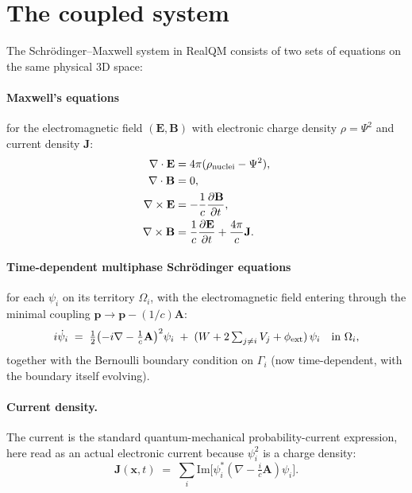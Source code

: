\section{The coupled system}\label{sec:sm-coupled}

The Schr\"odinger--Maxwell system in RealQM consists of two sets of equations on the same physical 3D space:

\paragraph{Maxwell's equations} for the electromagnetic field $(\mathbf{E}, \mathbf{B})$ with electronic charge density $\rho = \Psi^2$ and current density $\mathbf{J}$:
\begin{align}
\nabla \cdot \mathbf{E} &= 4\pi (\rho_{\rm nuclei} - \Psi^2), \label{eq:gauss} \\
\nabla \cdot \mathbf{B} &= 0, \\
\nabla \times \mathbf{E} &= -\frac{1}{c}\frac{\partial \mathbf{B}}{\partial t}, \\
\nabla \times \mathbf{B} &= \frac{1}{c}\frac{\partial \mathbf{E}}{\partial t} + \frac{4\pi}{c} \mathbf{J}. \label{eq:ampere}
\end{align}

\paragraph{Time-dependent multiphase Schr\"odinger equations} for each $\psi_i$ on its territory $\Omega_i$, with the electromagnetic field entering through the minimal coupling $\mathbf{p} \to \mathbf{p} - (1/c)\mathbf{A}$:
\begin{equation}\label{eq:tdse}
i \dot\psi_i \;=\; \tfrac{1}{2}\bigl(-i\nabla - \tfrac{1}{c}\mathbf{A}\bigr)^2 \psi_i \;+\; (W + 2 \textstyle\sum_{j \ne i} V_j + \phi_{\rm ext})\, \psi_i
\quad\text{in } \Omega_i,
\end{equation}
together with the Bernoulli boundary condition on $\Gamma_i$ (now time-dependent, with the boundary itself evolving).

\paragraph{Current density.} The current is the standard quantum-mechanical probability-current expression, here read as an actual electronic current because $\psi_i^2$ is a charge density:
\begin{equation}\label{eq:current}
\mathbf{J}(\mathbf{x}, t) \;=\; \sum_i \mathrm{Im}\bigl[\psi_i^* (\nabla - \tfrac{i}{c}\mathbf{A}) \psi_i\bigr].
\end{equation}

